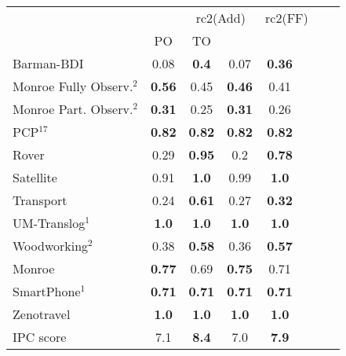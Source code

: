 \begin{tabular}{lccccccl} 
\toprule 
  && \multicolumn{2}{c}{rc2(Add)} & \multicolumn{2}{c}{rc2(FF)} \\ 
\cmidrule(lr){3-4} \cmidrule(lr){5-6}  
 &PO & TO  \\ 
\midrule 
Barman-BDI & 0.08 & \textbf{0.4} & 0.07 & \textbf{0.36}  \\ 
Monroe Fully Observ.$^{2}$ & \textbf{0.56} & 0.45 & \textbf{0.46} & 0.41  \\ 
Monroe Part. Observ.$^{2}$ & \textbf{0.31} & 0.25 & \textbf{0.31} & 0.26  \\ 
PCP$^{17}$ & \textbf{0.82} & \textbf{0.82} & \textbf{0.82} & \textbf{0.82}  \\ 
Rover & 0.29 & \textbf{0.95} & 0.2 & \textbf{0.78}  \\ 
Satellite & 0.91 & \textbf{1.0} & 0.99 & \textbf{1.0}  \\ 
Transport & 0.24 & \textbf{0.61} & 0.27 & \textbf{0.32}  \\ 
UM-Translog$^{1}$ & \textbf{1.0} & \textbf{1.0} & \textbf{1.0} & \textbf{1.0}  \\ 
Woodworking$^{2}$ & 0.38 & \textbf{0.58} & 0.36 & \textbf{0.57}  \\ 
\midrule 
 Monroe & \textbf{0.77} & 0.69 & \textbf{0.75} & 0.71  \\ 
SmartPhone$^{1}$ & \textbf{0.71} & \textbf{0.71} & \textbf{0.71} & \textbf{0.71}  \\ 
Zenotravel & \textbf{1.0} & \textbf{1.0} & \textbf{1.0} & \textbf{1.0}  \\ 
\midrule 
 IPC score & 7.1 & \textbf{8.4} & 7.0 & \textbf{7.9}  \\ 
\bottomrule 
 \end{tabular} 
